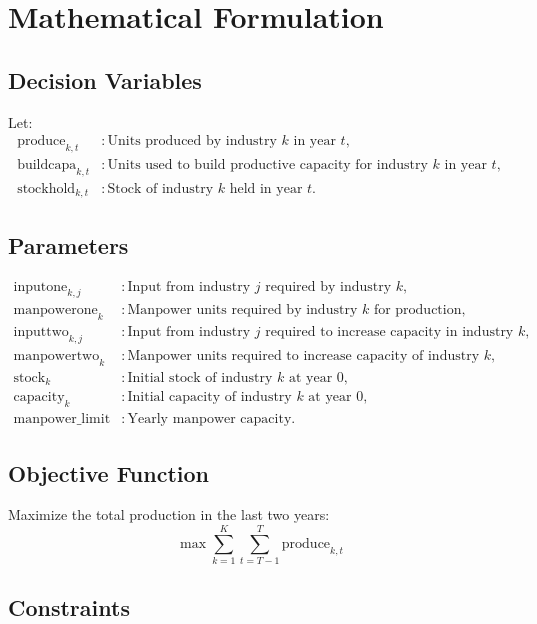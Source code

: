 \documentclass{article}
\begin{document}
\section*{Mathematical Formulation}

\subsection*{Decision Variables}
Let:
\begin{align*}
    \text{produce}_{k, t} & : \text{Units produced by industry } k \text{ in year } t, \\
    \text{buildcapa}_{k, t} & : \text{Units used to build productive capacity for industry } k \text{ in year } t, \\
    \text{stockhold}_{k, t} & : \text{Stock of industry } k \text{ held in year } t.
\end{align*}

\subsection*{Parameters}
\begin{align*}
    \text{inputone}_{k, j} & : \text{Input from industry } j \text{ required by industry } k, \\
    \text{manpowerone}_{k} & : \text{Manpower units required by industry } k \text{ for production}, \\
    \text{inputtwo}_{k, j} & : \text{Input from industry } j \text{ required to increase capacity in industry } k, \\
    \text{manpowertwo}_{k} & : \text{Manpower units required to increase capacity of industry } k, \\
    \text{stock}_{k} & : \text{Initial stock of industry } k \text{ at year 0}, \\
    \text{capacity}_{k} & : \text{Initial capacity of industry } k \text{ at year 0}, \\
    \text{manpower\_limit} & : \text{Yearly manpower capacity}.
\end{align*}

\subsection*{Objective Function}
Maximize the total production in the last two years:
\[
\max \sum_{k=1}^K \sum_{t=T-1}^T \text{produce}_{k, t}
\]

\subsection*{Constraints}
\end{document}
